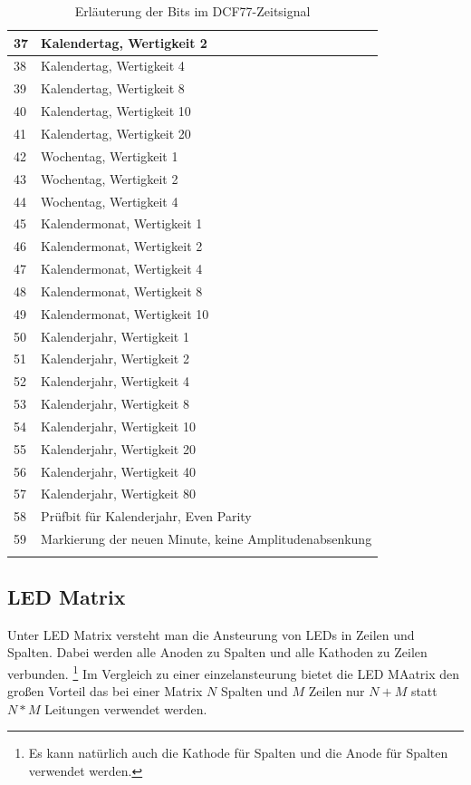 \begin{longtable}{|l|l|}
37 & Kalendertag, Wertigkeit 2\\\hline
38 & Kalendertag, Wertigkeit 4\\\hline
39 & Kalendertag, Wertigkeit 8\\\hline
40 & Kalendertag, Wertigkeit 10\\\hline
41 & Kalendertag, Wertigkeit 20\\\hline
42 & Wochentag, Wertigkeit 1\\\hline
43 & Wochentag, Wertigkeit 2\\\hline
44 & Wochentag, Wertigkeit 4\\\hline
45 & Kalendermonat, Wertigkeit 1\\\hline
46 & Kalendermonat, Wertigkeit 2\\\hline
47 & Kalendermonat, Wertigkeit 4\\\hline
48 & Kalendermonat, Wertigkeit 8\\\hline
49 & Kalendermonat, Wertigkeit 10\\\hline
50 & Kalenderjahr, Wertigkeit 1\\\hline
51 & Kalenderjahr, Wertigkeit 2\\\hline
52 & Kalenderjahr, Wertigkeit 4\\\hline
53 & Kalenderjahr, Wertigkeit 8\\\hline
54 & Kalenderjahr, Wertigkeit 10\\\hline
55 & Kalenderjahr, Wertigkeit 20\\\hline
56 & Kalenderjahr, Wertigkeit 40\\\hline
57 & Kalenderjahr, Wertigkeit 80\\\hline
58 & Prüfbit für Kalenderjahr, Even Parity\\\hline
59 & Markierung der neuen Minute, keine Amplitudenabsenkung\\\hline
\caption{Erläuterung der Bits im DCF77-Zeitsignal}\label{tbl_dcf77kod}
\end{longtable}
%
\subsection{LED Matrix}
Unter LED Matrix versteht man die Ansteurung von LEDs in Zeilen und Spalten. Dabei werden alle Anoden zu Spalten und alle Kathoden zu Zeilen
verbunden. \footnote{Es kann natürlich auch die Kathode für Spalten und die
Anode für Spalten verwendet werden.} Im Vergleich zu einer einzelansteurung
bietet die LED MAatrix den großen Vorteil das bei einer Matrix $N$ Spalten
und $M$ Zeilen nur $N+M$ statt $N*M$ Leitungen verwendet werden.

